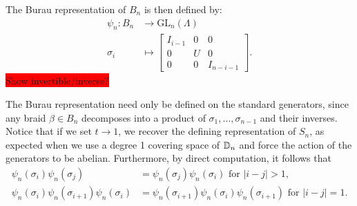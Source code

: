 The Burau representation of $B_n$ is then defined by:
\begin{align}
    \psi_n:B_n&\to\textrm{GL}_n(\Lambda) \\
    \sigma_i &\mapsto \begin{bmatrix}
        I_{i-1} & 0 & 0 \\
        0 & U & 0 \\
        0 & 0 & I_{n-i-1}
    \end{bmatrix}.
\end{align}
\colorbox{red}{Show invertible/inverse?}

The Burau representation need only be defined on the standard generators, since any braid $\beta\in B_n$ decomposes into a product of $\sigma_1,\dots,\sigma_{n-1}$ and their inverses. Notice that if we set $t\to 1$, we recover the defining representation of $S_n$, as expected when we use a degree 1 covering space of $\mathbb{D}_n$ and force the action of the generators to be abelian. Furthermore, by direct computation, it follows that
\begin{align}
    \psi_n(\sigma_i)\psi_n(\sigma_j) &= \psi_n(\sigma_j)\psi_n(\sigma_i) \textrm{ for } |i-j|>1, \\
    \psi_n(\sigma_i)\psi_n(\sigma_{i+1})\psi_n(\sigma_i) &= \psi_n(\sigma_{i+1})\psi_n(\sigma_i)\psi_n(\sigma_{i+1}) \textrm{ for } |i-j|=1.
\end{align}